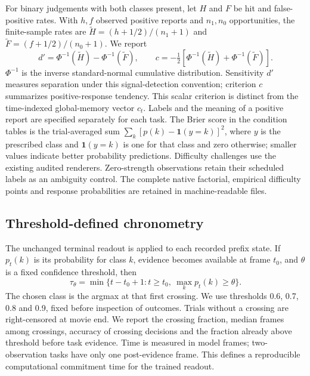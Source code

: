 \documentclass[11pt]{article}
\begin{document}
For binary judgements with both classes present, let $H$ and $F$ be hit and false-positive rates. With $h,f$ observed positive reports and $n_1,n_0$ opportunities, the finite-sample rates are $\widetilde H=(h+1/2)/(n_1+1)$ and $\widetilde F=(f+1/2)/(n_0+1)$. We report
\begin{equation}
 d'=\Phi^{-1}(\widetilde H)-\Phi^{-1}(\widetilde F),\qquad
 c=-\tfrac12[\Phi^{-1}(\widetilde H)+\Phi^{-1}(\widetilde F)].
\end{equation}
$\Phi^{-1}$ is the inverse standard-normal cumulative distribution. Sensitivity $d'$ measures separation under this signal-detection convention; criterion $c$ summarizes positive-response tendency. This scalar criterion is distinct from the time-indexed global-memory vector $c_t$. Labels and the meaning of a positive report are specified separately for each task. The Brier score in the condition tables is the trial-averaged sum $\sum_k[p(k)-\mathbf 1(y=k)]^2$, where $y$ is the prescribed class and $\mathbf 1(y=k)$ is one for that class and zero otherwise; smaller values indicate better probability predictions. Difficulty challenges use the existing audited renderers. Zero-strength observations retain their scheduled labels as an ambiguity control. The complete native factorial, empirical difficulty points and response probabilities are retained in machine-readable files.

\subsection{Threshold-defined chronometry}
The unchanged terminal readout is applied to each recorded prefix state. If $p_t(k)$ is its probability for class $k$, evidence becomes available at frame $t_0$, and $\theta$ is a fixed confidence threshold, then
\begin{equation}
 \tau_\theta=\min\{t-t_0+1:t\geq t_0,\ \max_k p_t(k)\geq\theta\}.
\end{equation}
The chosen class is the argmax at that first crossing. We use thresholds 0.6, 0.7, 0.8 and 0.9, fixed before inspection of outcomes. Trials without a crossing are right-censored at movie end. We report the crossing fraction, median frames among crossings, accuracy of crossing decisions and the fraction already above threshold before task evidence. Time is measured in model frames; two-observation tasks have only one post-evidence frame. This defines a reproducible computational commitment time for the trained readout.
\end{document}
